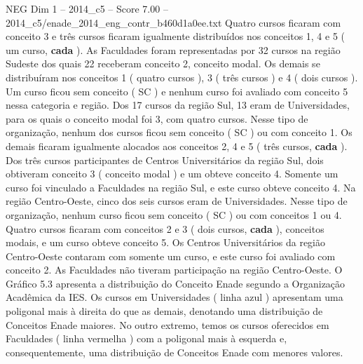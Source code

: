 \begin{textsample}{NEG Dim 1 – 2014\_c5 – Score 7.00 – 2014\_c5/enade\_2014\_eng\_contr\_b460d1a0ee.txt}
Quatro cursos ficaram com conceito 3 e três cursos ficaram igualmente distribuídos nos conceitos 1, 4 e 5 ( um curso, \textbf{cada} ).
As Faculdades foram representadas por 32 cursos na região Sudeste dos quais 22 receberam conceito 2, conceito modal.
Os demais se distribuíram nos conceitos 1 ( quatro cursos ), 3 ( três cursos ) e 4 ( dois cursos ).
Um curso ficou sem conceito ( SC ) e nenhum curso foi avaliado com conceito 5 nessa categoria e região.
Dos 17 cursos da região Sul, 13 eram de Universidades, para os quais o conceito modal foi 3, com quatro cursos.
Nesse tipo de organização, nenhum dos cursos ficou sem conceito ( SC ) ou com conceito 1.
Os demais ficaram igualmente alocados aos conceitos 2, 4 e 5 ( três cursos, \textbf{cada} ).
Dos três cursos participantes de Centros Universitários da região Sul, dois obtiveram conceito 3 ( conceito modal ) e um obteve conceito 4.
Somente um curso foi vinculado a Faculdades na região Sul, e este curso obteve conceito 4.
Na região Centro-Oeste, cinco dos seis cursos eram de Universidades.
Nesse tipo de organização, nenhum curso ficou sem conceito ( SC ) ou com conceitos 1 ou 4.
Quatro cursos ficaram com conceitos 2 e 3 ( dois cursos, \textbf{cada} ), conceitos modais, e um curso obteve conceito 5.
Os Centros Universitários da região Centro-Oeste contaram com somente um curso, e este curso foi avaliado com conceito 2.
As Faculdades não tiveram participação na região Centro-Oeste.
O Gráfico 5.3 apresenta a distribuição do Conceito Enade segundo a Organização Acadêmica da IES.
Os cursos em Universidades ( linha azul ) apresentam uma poligonal mais à direita do que as demais, denotando uma distribuição de Conceitos Enade maiores.
No outro extremo, temos os cursos oferecidos em Faculdades ( linha vermelha ) com a poligonal mais à esquerda e, consequentemente, uma distribuição de Conceitos Enade com menores valores.

\end{textsample}

